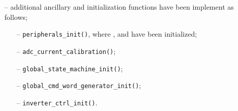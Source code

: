 \documentclass[11pt,a4paper,oneside]{book}
\numberwithin{equation}{section}
\theoremstyle{it}
\theoremstyle{definition}
\begin{document}
\begin{itemize}
\begin{itemize}
\begin{itemize}
			\end{itemize}
	\end{itemize}
	\item[--] additional ancillary and initialization functions have been implement as follows;
	\begin{itemize}
		\item[--] {\selectfont \verb+peripherals_init()+}, where ,  and  have been initialized;
		\item[--] {\selectfont \verb+adc_current_calibration()+};
		\item[--] {\selectfont \verb+global_state_machine_init()+};
		\item[--] {\selectfont \verb+global_cmd_word_generator_init()+};
		\item[--] {\selectfont \verb+inverter_ctrl_init()+}.		
	\end{itemize}
\end{itemize}
\end{document}
